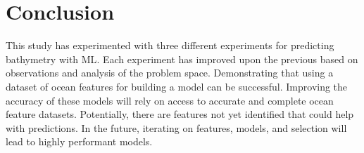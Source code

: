 \section{Conclusion}
\setlength{\parindent}{10ex}
This study has experimented with three different experiments for predicting bathymetry with \ac{ML}.
Each experiment has improved upon the previous based on observations and analysis of the problem space.
Demonstrating that using a dataset of ocean features for building a model can be successful.
Improving the accuracy of these models will rely on access to accurate and complete ocean feature datasets.
Potentially, there are features not yet identified that could help with predictions.
In the future, iterating on features, models, and selection will lead to highly performant models.
